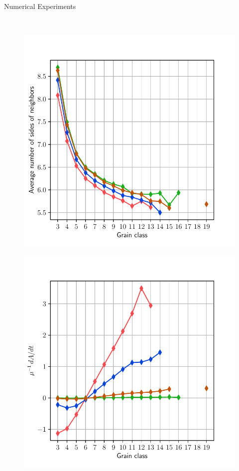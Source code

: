 \documentclass[usenames,dvipsnames]{beamer}
\begin{document}
\begin{frame}{Numerical Experiments}
\begin{minipage}{0.5\textwidth}
\begin{figure}
\end{figure}
\end{minipage}\\
\begin{minipage}{0.5\textwidth}
\begin{figure}
	\includegraphics[trim={0 1em 0 3em},clip=true,scale=0.35]{figures/coupled_model/alt/avg.pdf}
\end{figure}
\end{minipage}%
\begin{minipage}{0.5\textwidth}
\begin{figure}
    \includegraphics[trim={0 1em 0 3em},clip=true,scale=0.35]{figures/coupled_model/alt/dAdt.pdf}

\end{figure}
\end{minipage}
\end{frame}
\end{document}

